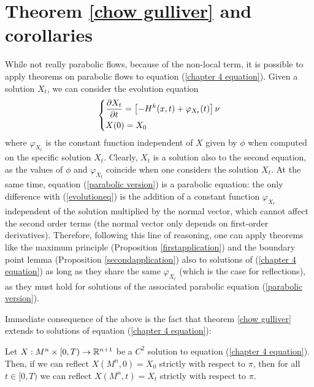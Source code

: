 \section{Theorem \ref{chow gulliver} and corollaries}
While not really parabolic flows, because of the non-local term, it is possible to apply theorems on parabolic flows to equation (\ref{chapter 4 equation}). Given a solution $X_t$, we can consider the evolution equation 
\begin{align}
	\begin{dcases}
		\frac{\partial X_t}{\partial t} = \left[- H^k(x, t) + \varphi_{X_t}(t)\right] \nu\\
		X(0)= X_0
	\end{dcases} \label{parabolic version}
\end{align}
where $\varphi_{X_t}$ is the constant function independent of $X$ given by $\phi$ when computed on the specific solution $X_t$. 
Clearly, $X_t$ is a solution also to the second equation, as the values of  $\phi$ and $\varphi_{X_t}$ coincide when one considers the solution $X_t$. At the same time, equation (\ref{parabolic version}) is a parabolic equation: the only difference with (\ref{evolutioneq}) is the addition of a constant function $\varphi_{X_t}$ independent of the solution multiplied by the normal vector, which cannot affect the second order terms (the normal vector only depends on first-order derivatives). Therefore, following this line of reasoning, one can apply theorems like the maximum principle (Proposition \ref{firstapplication}) and the boundary point lemma (Proposition \ref{secondapplication}) also to solutions of (\ref{chapter 4 equation}) as long as they share the same $\varphi_{X_t}$ (which is the case for reflections), as they must hold for solutions of the associated parabolic equation (\ref{parabolic version}). %

Immediate consequence of the above is the fact that theorem \ref{chow gulliver} extends to solutions of equation (\ref{chapter 4 equation}):

\begin{theorem}
	Let $X:M^n\times [0,T) \rightarrow \mathbb{R}^{n+1}$ be a $C^2$ solution to equation (\ref{chapter 4 equation}). Then, if we can reflect $X(M^n, 0)=X_0$ strictly with respect to $\pi$, then for all $t\in [0,T)$ we can reflect $X(M^n, t)=X_t$ strictly with respect to $\pi$. \label{chow gulliver chapter 4}
\end{theorem}

